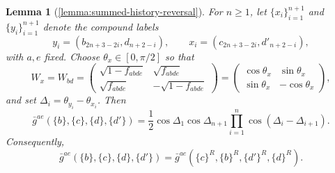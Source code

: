 \documentclass[aps,floatfix,10pt,amssymb,amsfont,amsmath,superscriptaddress,float,nofootinbib,longbibliography,nobalancelastpage,twocolumn]{revtex4-2}
\newtheorem*{lemma*}{Lemma}
\begin{document}
\begin{lemma*}[\ref{lemma:summed-history-reversal}]
For $n\geq1$, let $\{x_i\}_{i=1}^{n+1}$ and $\{y_i\}_{i=1}^{n+1}$ denote
the compound labels
\begin{equation*}
    y_i=(b_{2n+3-2i},d_{n+2-i}),\qquad x_i=(c_{2n+3-2i},d'_{n+2-i}),
\end{equation*}
with $a,e$ fixed.  Choose $\theta_x\in[0,\pi/2]$ so that
\begin{equation*}
    W_x=W_{bd}=\begin{pmatrix}
                \sqrt{1 - f_{abde}} & \sqrt{f_{abde}}\\
       \sqrt{f_{abde}} & -\sqrt{1 - f_{abde}}
    \end{pmatrix}= \begin{pmatrix}\cos\theta_x&\sin\theta_x\\
    \sin\theta_x&-\cos\theta_x\end{pmatrix},
\end{equation*}
and set $\Delta_i=\theta_{y_i}-\theta_{x_i}$.  Then
\begin{equation}
    \bar g^{ae}(\{b\},\{c\},\{d\},\{d'\})
    =\frac12\cos\Delta_1\cos\Delta_{n+1}
      \prod_{i=1}^{n}\cos(\Delta_i-\Delta_{i+1}).
\end{equation}
Consequently,
\begin{equation}
    \bar g^{ae}(\{b\},\{c\},\{d\},\{d'\})
    =\bar g^{ae}(\{c\}^R,\{b\}^R,\{d'\}^R,\{d\}^R).
    \label{eq:PRR}
\end{equation}
\end{lemma*}
\end{document}
